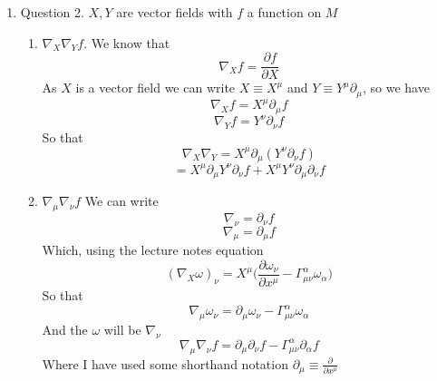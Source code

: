 \documentclass[12pt]{article}
\begin{document}
\begin{enumerate}
\item Question 2. $X,Y$ are vector fields with $f$ a function on $M$
\begin{enumerate}
  \item $\nabla_X \nabla_Y f$. We know that 
  $$ \nabla_X f = \frac{\partial f}{\partial X} $$
  As $X$ is a vector field we can write $X \equiv X^{\mu}$ and $Y \equiv Y^{\mu} \partial_{\mu}$, so we have 
  $$ \nabla_X f = X^{\mu} \partial_{\mu} f $$
  $$ \nabla_Y f = Y^{\nu} \partial_{\nu} f $$
  So that 
  $$ \nabla_X \nabla_Y = X^{\mu} \partial_{\mu} ( Y^{\nu} \partial_{\nu} f) $$
  $$ = X^{\mu} \partial_{\mu} Y^{\nu} \partial_{\nu} f + X^{\mu} Y^{\nu} \partial_{\mu} \partial_{\nu} f $$
  
  \item  $\nabla_{\mu} \nabla_{\nu} f$ We can write 
  $$ \nabla_{\nu} = \partial_{\nu} f $$
  $$ \nabla_{\mu} = \partial_{\mu} f $$
  Which, using the lecture notes equation 
  $$(\nabla_X \omega )_{\nu} = X^{\mu} \Big( \frac{\partial \omega_{\nu} }{\partial x^{\mu} } - \Gamma^{\alpha}_{\mu \nu} \omega_{\alpha} \Big) $$ 
  So that 
  $$ \nabla_{\mu} \omega_{\nu} = \partial_{\mu} \omega_{\nu} - \Gamma^{\alpha}_{\mu \nu} \omega_{\alpha} $$
  And the $\omega$ will be $\nabla_{\nu}$
  $$ \nabla_{\mu} \nabla_{\nu} f = \partial_{\mu} \partial_{\nu} f - \Gamma^{\alpha}_{\mu \nu} \partial_{\alpha} f $$
  Where I have used some shorthand notation $ \partial_{\mu} \equiv \frac{\partial}{\partial x^{\mu}}$



\end{enumerate}
\end{enumerate}
\end{document}
